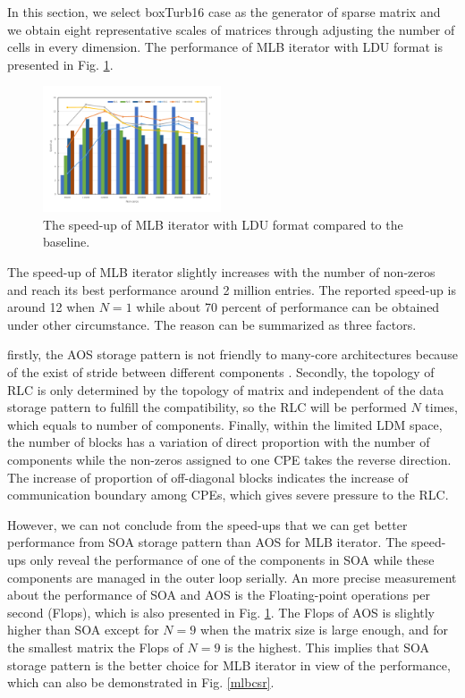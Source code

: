 \documentclass[conference]{IEEEtran}
\begin{document}
In this section, we select boxTurb16 case as the generator of sparse matrix and we obtain eight representative scales of matrices through adjusting the number of cells in every dimension.
The performance of MLB iterator with LDU format is presented in Fig. \ref{mlbldu}. 
\begin{figure}[tbp]
\centerline{\includegraphics[width=0.47\textwidth]{mlb(ldu).pdf}}
\caption{The speed-up of MLB iterator with LDU format compared to the baseline.}
\label{mlbldu}
\end{figure}
The speed-up of MLB iterator slightly increases with the number of non-zeros and reach its best performance around 2 million entries. The reported speed-up is around 12 when $N=1$ while about 70 percent of performance can be obtained under other circumstance. The reason can be summarized as three factors.

firstly, the AOS storage pattern is not friendly to many-core architectures because of the exist of stride between different components \cite{b10}\cite{b11}. Secondly, the topology of RLC is only determined by the topology of matrix and independent of the data storage pattern to fulfill the compatibility, so the RLC will be performed $N$ times, which equals to number of components. Finally, within the limited LDM space, the number of blocks has a variation of direct proportion with the number of components while the non-zeros assigned to one CPE takes the reverse direction. The increase of proportion of off-diagonal blocks indicates the increase of communication boundary among CPEs, which gives severe pressure to the RLC.

However, we can not conclude from the speed-ups that we can get better performance from SOA storage pattern than AOS for MLB iterator. The speed-ups only reveal the performance of one of the components in SOA while these components are managed in the outer loop serially. An more precise measurement about the performance of SOA and AOS is the Floating-point operations per second (Flops), which is also presented in Fig. \ref{mlbldu}. The Flops of AOS is slightly higher than SOA except for $N=9$ when the matrix size is large enough, and for the smallest matrix the Flops of $N=9$ is the highest. This implies that SOA storage pattern is the better choice for MLB iterator in view of the performance, which can also be demonstrated in Fig. \ref{mlbcsr}.
\end{document}
